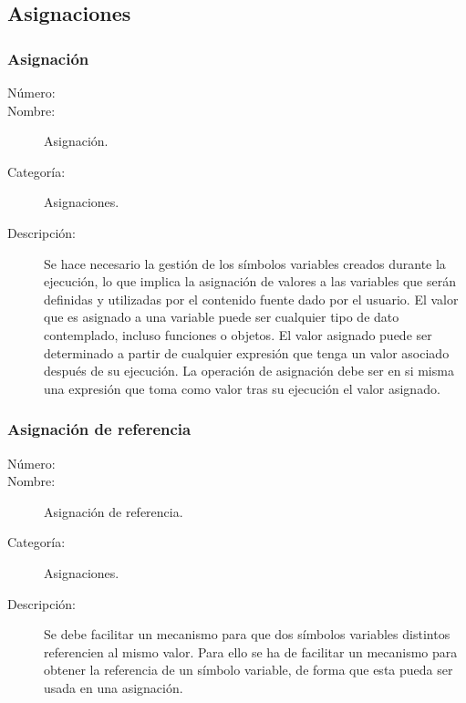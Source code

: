 \subsection{Asignaciones}
\subsubsection{Asignación}
	\begin{description}
		\item [Número:] \cn
		\item [Nombre:] Asignación.
		\item [Categoría:] Asignaciones.
		\item [Descripción:] Se hace necesario la gestión de los símbolos variables creados durante la ejecución, lo que implica
		la asignación de valores a las variables que serán definidas y utilizadas por el contenido fuente dado por el usuario.
		El valor que es asignado a una variable puede ser cualquier tipo de dato contemplado, incluso funciones o objetos. El valor asignado
		puede ser determinado a partir de cualquier expresión que tenga un valor asociado después de su ejecución.  La operación de asignación debe ser en si misma una expresión que toma como
		valor tras su ejecución el valor asignado.
	\end {description}

\subsubsection{Asignación de referencia}
	\begin{description}
		\item [Número:] \cn
		\item [Nombre:] Asignación de referencia.
		\item [Categoría:] Asignaciones.
		\item [Descripción:] Se debe facilitar un mecanismo para que dos símbolos variables distintos referencien al mismo valor.
		Para ello se ha de facilitar un mecanismo para obtener la referencia de un símbolo variable, de forma que esta pueda ser usada en una asignación.
	\end {description}
